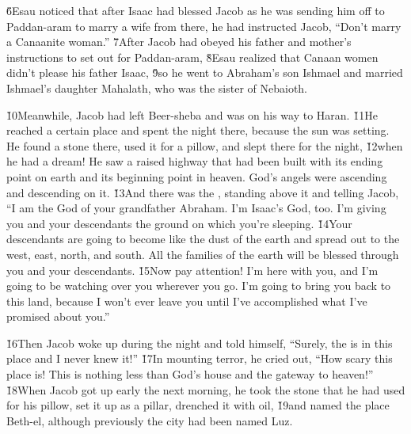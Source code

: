 \v{6}Esau noticed that after Isaac had blessed Jacob as he was sending him off to Paddan-aram to marry a wife from there, he had instructed Jacob, ``Don't marry a Canaanite woman.'' \v{7}After Jacob had obeyed his father and mother's instructions to set out for Paddan-aram, \v{8}Esau realized that Canaan women didn't please his father Isaac, \v{9}so he went to Abraham's son Ishmael and married Ishmael's daughter Mahalath, who was the sister of Nebaioth.

\v{10}Meanwhile, Jacob had left Beer-sheba and was on his way to Haran. \v{11}He reached a certain place and spent the night there, because the sun was setting. He found a stone there, used it for a pillow, and slept there for the night, \v{12}when he had a dream! He saw a raised highway that had been built with its ending point on earth and its beginning point in heaven. God's angels were ascending and descending on it. \v{13}And there was the , standing above it and telling Jacob, ``I am the  God of your grandfather Abraham. I'm Isaac's God, too. I'm giving you and your descendants the ground on which you're sleeping. \v{14}Your descendants are going to become like the dust of the earth and spread out to the west, east, north, and south. All the families of the earth will be blessed through you and your descendants. \v{15}Now pay attention! I'm here with you, and I'm going to be watching over you wherever you go. I'm going to bring you back to this land, because I won't ever leave you until I've accomplished what I've promised about you.''

\v{16}Then Jacob woke up during the night and told himself, ``Surely, the  is in this place and I never knew it!'' \v{17}In mounting terror, he cried out, ``How scary this place is! This is nothing less than God's house and the gateway to heaven!'' \v{18}When Jacob got up early the next morning, he took the stone that he had used for his pillow, set it up as a pillar, drenched it with oil, \v{19}and named the place Beth-el, although previously the city had been named Luz.

